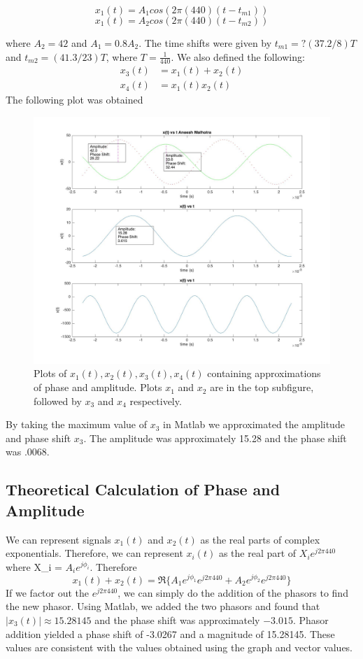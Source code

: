 \documentclass{article}
\begin{document}
$$x_1(t) = A_1cos( 2\pi (440)(t- t_{m1}))$$
$$x_1(t) = A_2cos( 2\pi (440)(t- t_{m2}))$$

where $A_2 = 42$ and $A_1 = 0.8 A_2$. The time shifts were given by $ t_{m1} = ?(37.2/8)T$ and $t_{m2} = (41.3/23)T$, where $T = \frac{1}{440}$. We also defined the following:
\begin{align*} 
x_3(t) &= x_1(t) + x_2(t) \\
x_4(t) &= x_1(t) x_2(t) 
\end{align*}
The following plot was obtained

\begin{figure}[t!]
\begin{center}
\includegraphics[scale = 0.25]{figure1_part3.jpg}
\caption{Plots of $x_1(t), x_2(t), x_3(t),x_4(t)$ containing approximations of phase and amplitude. Plots $x_1$ and $x_2$ are in the top subfigure, followed by $x_3$ and $x_4$ respectively.}
\end{center}
\end{figure}

By taking the maximum value of $x_3$ in Matlab we approximated the amplitude and phase shift $x_3$. The amplitude was approximately 15.28 and the phase shift was .0068. 

\subsection{Theoretical Calculation of Phase and Amplitude}

We can represent signals $x_1(t)$ and $x_2(t)$ as the real parts of complex exponentials. Therefore, we can represent $x_i(t)$ as the real part of $X_i e ^{j 2 \pi 440}$ where X_i = $A_i e^{j \phi_i}$.
Therefore $$x_1(t) + x_2(t) = \Re\{A_1 e^{j \phi_1} e^{j 2 \pi 440} + A_2 e^{j \phi_2} e^{j 2 \pi 440}\}$$ If we factor out the $e^{j 2 \pi 440}$, we can simply do the addition of the phasors to find the new phasor. Using Matlab, we added the two phasors and found that $|x_3(t)| \approx 15.28145$ and the phase shift was approximately $-3.015$. Phasor addition yielded a phase shift of -3.0267 and a magnitude of 15.28145. These values are consistent with the values obtained using the graph and vector values. 
\end{document}
